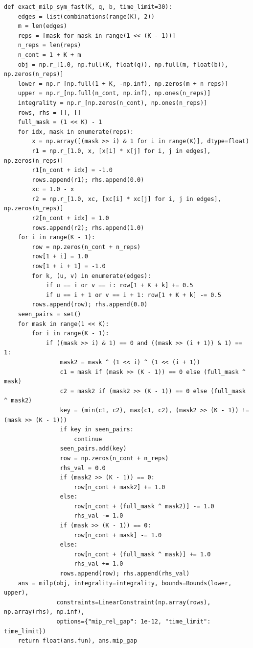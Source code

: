 \documentclass[11pt,a4paper]{article}
\theoremstyle{definition}
\theoremstyle{remark}
\begin{document}
\begin{lstlisting}
def exact_milp_sym_fast(K, q, b, time_limit=30):
    edges = list(combinations(range(K), 2))
    m = len(edges)
    reps = [mask for mask in range(1 << (K - 1))]
    n_reps = len(reps)
    n_cont = 1 + K + m
    obj = np.r_[1.0, np.full(K, float(q)), np.full(m, float(b)), np.zeros(n_reps)]
    lower = np.r_[np.full(1 + K, -np.inf), np.zeros(m + n_reps)]
    upper = np.r_[np.full(n_cont, np.inf), np.ones(n_reps)]
    integrality = np.r_[np.zeros(n_cont), np.ones(n_reps)]
    rows, rhs = [], []
    full_mask = (1 << K) - 1
    for idx, mask in enumerate(reps):
        x = np.array([(mask >> i) & 1 for i in range(K)], dtype=float)
        r1 = np.r_[1.0, x, [x[i] * x[j] for i, j in edges], np.zeros(n_reps)]
        r1[n_cont + idx] = -1.0
        rows.append(r1); rhs.append(0.0)
        xc = 1.0 - x
        r2 = np.r_[1.0, xc, [xc[i] * xc[j] for i, j in edges], np.zeros(n_reps)]
        r2[n_cont + idx] = 1.0
        rows.append(r2); rhs.append(1.0)
    for i in range(K - 1):
        row = np.zeros(n_cont + n_reps)
        row[1 + i] = 1.0
        row[1 + i + 1] = -1.0
        for k, (u, v) in enumerate(edges):
            if u == i or v == i: row[1 + K + k] += 0.5
            if u == i + 1 or v == i + 1: row[1 + K + k] -= 0.5
        rows.append(row); rhs.append(0.0)
    seen_pairs = set()
    for mask in range(1 << K):
        for i in range(K - 1):
            if ((mask >> i) & 1) == 0 and ((mask >> (i + 1)) & 1) == 1:
                mask2 = mask ^ (1 << i) ^ (1 << (i + 1))
                c1 = mask if (mask >> (K - 1)) == 0 else (full_mask ^ mask)
                c2 = mask2 if (mask2 >> (K - 1)) == 0 else (full_mask ^ mask2)
                key = (min(c1, c2), max(c1, c2), (mask2 >> (K - 1)) != (mask >> (K - 1)))
                if key in seen_pairs:
                    continue
                seen_pairs.add(key)
                row = np.zeros(n_cont + n_reps)
                rhs_val = 0.0
                if (mask2 >> (K - 1)) == 0:
                    row[n_cont + mask2] += 1.0
                else:
                    row[n_cont + (full_mask ^ mask2)] -= 1.0
                    rhs_val -= 1.0
                if (mask >> (K - 1)) == 0:
                    row[n_cont + mask] -= 1.0
                else:
                    row[n_cont + (full_mask ^ mask)] += 1.0
                    rhs_val += 1.0
                rows.append(row); rhs.append(rhs_val)
    ans = milp(obj, integrality=integrality, bounds=Bounds(lower, upper),
               constraints=LinearConstraint(np.array(rows), np.array(rhs), np.inf),
               options={"mip_rel_gap": 1e-12, "time_limit": time_limit})
    return float(ans.fun), ans.mip_gap


\end{lstlisting}
\end{document}
